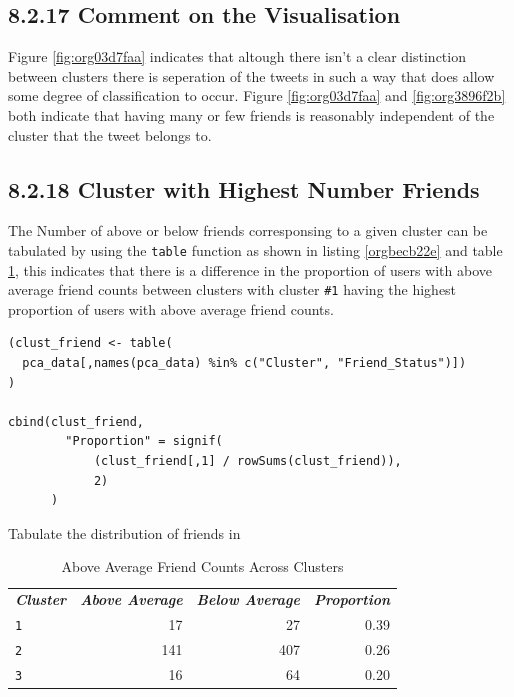 \documentclass[11pt]{article}
\begin{document}
\subsection{8.2.17 Comment on the Visualisation}
\label{sec:orgb426754}
Figure \ref{fig:org03d7faa} indicates that altough there isn't a clear distinction between
clusters there is seperation of the tweets in such a way that does allow some
degree of classification to occur. Figure \ref{fig:org03d7faa} and \ref{fig:org3896f2b} both indicate that having
many or few friends is reasonably independent of the cluster that the tweet
belongs to.
\subsection{8.2.18 Cluster with Highest Number Friends}
\label{sec:org685fedf}
The Number of above or below friends corresponsing to a given cluster can be tabulated by using the \texttt{table} function as shown in listing \ref{orgbecb22e} and table \ref{tab:orgd897c91}, this indicates that there is a difference in the proportion of users with above average friend counts between clusters with cluster \texttt{\#1} having the highest proportion of users with above average friend counts.

\begin{listing}[htbp]
\begin{verbatim}
(clust_friend <- table(
  pca_data[,names(pca_data) %in% c("Cluster", "Friend_Status")])
)

cbind(clust_friend,
        "Proportion" = signif(
            (clust_friend[,1] / rowSums(clust_friend)),
            2)
      )
\end{verbatim}
\caption{\label{orgbecb22e}Tabulate the distribution of friends in}
\end{listing}

\begin{table}[htbp]
\caption{\label{tab:orgd897c91}Above Average Friend Counts Across Clusters}
\centering
\begin{tabular}{lrrr}
\textbf{\emph{Cluster}} & \textbf{\emph{Above Average}} & \textbf{\emph{Below Average}} & \textbf{\emph{Proportion}}\\
\texttt{1} & 17 & 27 & 0.39\\
\texttt{2} & 141 & 407 & 0.26\\
\texttt{3} & 16 & 64 & 0.20\\
\end{tabular}
\end{table}
\end{document}
